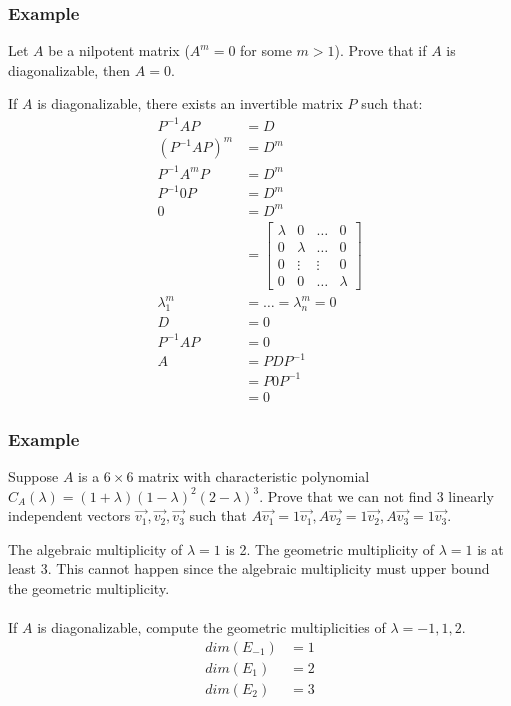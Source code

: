 \documentclass{math}
\begin{document}
\subsubsection*{Example}
Let \( A \) be a nilpotent matrix (\( A^m = 0 \) for some \( m>1 \)). Prove that
if \( A \) is diagonalizable, then \( A = 0 \). \par
If \( A \) is diagonalizable, there exists an invertible matrix \( P \) such
that:
\begin{align*}
  P^{-1}AP &= D \\
  (P^{-1}AP)^m &= D^m \\
  P^{-1}A^mP &= D^m \\
  P^{-1}0P &= D^m \\
  0 &= D^m \\
  &= \begin{bmatrix}
    \lambda & 0 & \dots & 0 \\
    0 & \lambda & \dots & 0 \\
    0 & \vdots & \vdots & 0 \\
    0 & 0 & \dots & \lambda
  \end{bmatrix} \\
  \lambda_1^m &= \dots = \lambda_n^m = 0 \\
  D &= 0 \\
  P^{-1}AP &= 0 \\
  A &= PDP^{-1} \\
  &= P0P^{-1} \\
  &= 0
\end{align*}

\subsubsection*{Example}
Suppose \( A \) is a \( 6\times6 \) matrix with characteristic polynomial
\( C_A(\lambda) = (1+\lambda)(1-\lambda)^2(2-\lambda)^3 \). Prove that we can
not find 3 linearly independent vectors \( \vec{v_1},\vec{v_2},\vec{v_3} \)
such that \( A\vec{v_1} = 1\vec{v_1}, A\vec{v_2} = 1\vec{v_2}, A\vec{v_3} =
1\vec{v_3} \). \par
The algebraic multiplicity of \( \lambda = 1 \) is 2. The geometric multiplicity
of \( \lambda = 1 \) is at least 3. This cannot happen since the algebraic
multiplicity must upper bound the geometric multiplicity. \\ \\
If \( A \) is diagonalizable, compute the geometric multiplicities of
\( \lambda = -1,1,2 \).
\begin{align*}
  dim(E_{-1}) &= 1 \\
  dim(E_1) &= 2 \\
  dim(E_2) &= 3
\end{align*}
\end{document}
